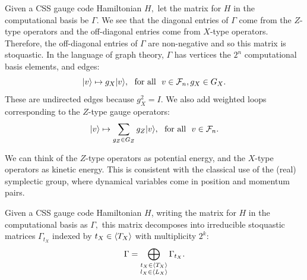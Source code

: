 Given a CSS gauge code Hamiltonian $H,$ 
let the matrix for $H$ in the computational basis be $\Gamma.$
We see that the diagonal entries of $\Gamma$
come from the $Z$-type operators and the off-diagonal entries 
come from $X$-type operators.
Therefore, the off-diagonal entries of $\Gamma$ are non-negative 
and so this matrix is stoquastic.
In the language of graph theory,
$\Gamma$ has vertices the $2^n$ computational
basis elements, and edges:
$$
    |{v}\rangle \mapsto g_X |{v}\rangle, \ \ \mbox{for all}\ \  v\in\mathcal{F}_{n}, g_X\in G_X.
$$
These are undirected edges because $g_X^2 = I.$
We also add weighted loops corresponding to the $Z$-type gauge operators:
$$
    |{v}\rangle \mapsto \sum_{g_Z\in G_Z} g_Z |{v}\rangle, \ \ \mbox{for all}\ \  v\in\mathcal{F}_{n}.
$$

We can think of the $Z$-type operators as potential energy,
and the $X$-type operators as kinetic energy.
This is consistent with the classical use of the (real) symplectic group,
where dynamical variables come in position and momentum pairs.

Given a CSS gauge code Hamiltonian $H$, writing
the matrix for $H$ in the computational basis as $\Gamma,$
this matrix decomposes into irreducible
stoquastic matrices $\Gamma_{t_X}$ 
indexed by $t_X\in\langle T_X \rangle$
with multiplicity $2^k$:
$$
    \Gamma = \bigoplus_{
    \substack{t_X\in\langle T_X \rangle\\l_X\in\langle L_X \rangle}}
        \Gamma_{t_X}.
$$


